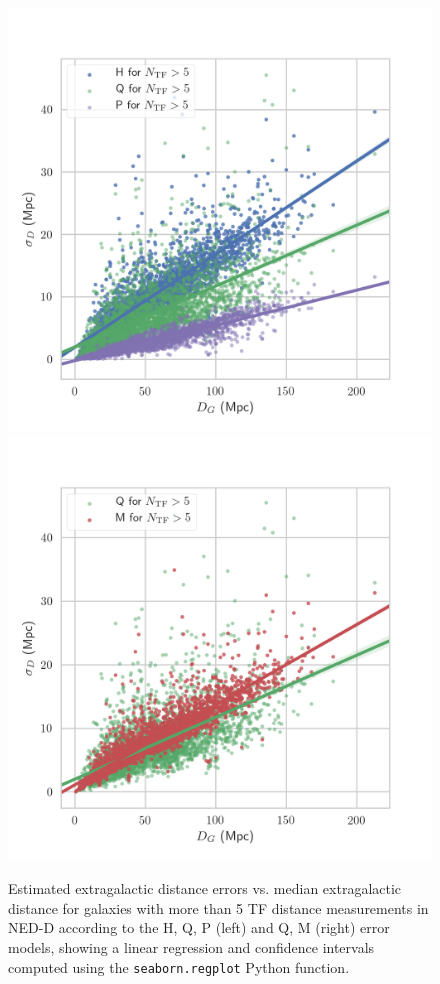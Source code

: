 \documentclass[a4paper,fleqn,usenatbib]{mnras}
\begin{document}
\begin{figure}

	\includegraphics[scale=0.69]{hqp.png}
	\includegraphics[scale=0.69]{qm.png}
    \caption{Estimated extragalactic distance errors vs. median extragalactic distance  for galaxies with more than 5 TF distance measurements in NED-D according to the H, Q, P (left) and Q, M (right) error models, showing a linear regression and confidence intervals computed using the \texttt{seaborn.regplot} Python function.}
    \label{fig:hqp-qm}
\end{figure}
\end{document}
